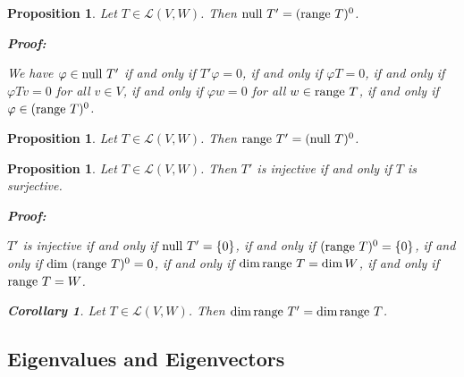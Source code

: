 \documentclass{article}
\theoremstyle{colontheorem}
\newtheorem{proposition}[theorem]{Proposition}
\newtheorem{corollary}{Corollary}[theorem]
\newcommand{\Null}{\textnormal{null }}
\newcommand{\Range}{\textnormal{range }}
\newenvironment{Proposition}
{
	\begin{mdframed}[backgroundcolor=TheoremOrange!10]
	\begin{proposition}
}
{
	\end{proposition}
	\end{mdframed}
	
	\vspace{.15in}
}
\newenvironment{Corollary}
{
	\begin{mdframed}[backgroundcolor=CorollaryBlue!10]
	\begin{corollary}
}
{
	\end{corollary}
	\end{mdframed}
	
	\vspace{.09in}
}
\newenvironment{Proof}
{
	\begin{mdframed}[backgroundcolor=ProofPurple!10]
	\textbf{Proof:}%
}
{
	\end{mdframed}
	
	\vspace{.085in}
}
\begin{document}
\begin{Proposition}
	
	Let $T \in \mathcal{L}(V,W)$. Then $\Null T' = (\Range T)^0$.
	
	\begin{Proof}
		We have $\varphi \in \Null T'$ if and only if $T'\varphi = 0$, if and only if $\varphi T = 0$, if and only if $\varphi Tv = 0$ for all $v \in V$, if and only if $\varphi w = 0$ for all $w \in \Range T$, if and only if $\varphi \in (\Range T)^0$.
		
	\end{Proof}
	
\end{Proposition}



\begin{Proposition}
	
	Let $T \in \mathcal{L}(V,W)$. Then $\Range T' = (\Null T)^0$.
	
\end{Proposition}



\begin{Proposition}
	
	Let $T \in \mathcal{L}(V,W)$. Then $T'$ is injective if and only if $T$ is surjective.
	
	\begin{Proof}
		$T'$ is injective if and only if $\Null T' = \{0\}$, if and only if $(\Range T)^0 = \{0\}$, if and only if $\dim\  (\Range T)^0 = 0$, if and only if $\dim \Range T = \dim W$, if and only if $\Range T = W$.
		
	\end{Proof}
	\vspace{.1in}
	\begin{Corollary}
		
		Let $T \in \mathcal{L}(V,W)$. Then $\dim \Range T' = \dim \Range T$.
		
	\end{Corollary}
	
\end{Proposition}





\begin{center}
	\pagebreak
	
	\section{Eigenvalues and Eigenvectors}
	
	\vspace{.1in}
\end{center}
\end{document}
